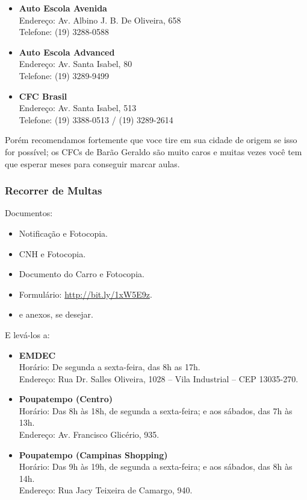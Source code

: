 \begin{itemize}
    \item \textbf{Auto Escola Avenida} \\Endereço: Av. Albino J. B. De Oliveira,
658 \\Telefone: (19) 3288-0588

    \item \textbf{Auto Escola Advanced} \\Endereço: Av. Santa Isabel, 80
\\Telefone: (19) 3289-9499

    \item \textbf{CFC Brasil} \\Endereço: Av. Santa Isabel, 513
\\Telefone: (19) 3388-0513 / (19) 3289-2614
\end{itemize}

Porém recomendamos fortemente que voce tire em sua cidade de origem se isso for
possível; os CFCs de Barão Geraldo são muito caros e muitas vezes você tem que
esperar meses para conseguir marcar aulas.

\subsubsection*{Recorrer de Multas}

Documentos:
\begin{itemize}
    \item Notificação e Fotocopia.
    \item CNH e Fotocopia.
    \item Documento do Carro e Fotocopia.
    \item Formulário:
      \url{http://bit.ly/1xW5E9z}.
    \item e anexos, se desejar.
\end{itemize}

E levá-los a:
\begin{itemize}
    \item \textbf{EMDEC} \\Horário: De segunda a sexta-feira, das 8h as 17h.
\\Endereço: Rua Dr. Salles Oliveira, 1028 -- Vila Industrial -- CEP 13035-270.
    \item \textbf{Poupatempo (Centro)} \\Horário: Das 8h às 18h, de segunda a
sexta-feira; e aos sábados, das 7h às 13h.  \\Endereço: Av. Francisco Glicério,
935.
    \item \textbf{Poupatempo (Campinas Shopping)} \\Horário: Das 9h às 19h, de
segunda a sexta-feira; e aos sábados, das 8h às 14h.  \\Endereço: Rua Jacy
Teixeira de Camargo, 940.
\end{itemize}

